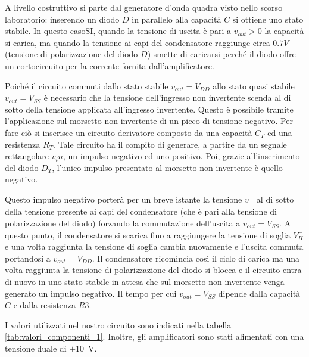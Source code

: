 A livello costruttivo si parte dal generatore d'onda quadra visto nello scorso laboratorio: inserendo un diodo $D$ in parallelo alla capacità $C$ si ottiene uno stato stabile. In questo casoSI, quando la tensione di uscita è pari a $v_{out}>0$ la capacità si carica, ma quando la tensione ai capi del condensatore raggiunge circa $0.7V$ (tensione di polarizzazione del diodo $D$) smette di caricarsi perché il diodo offre un cortocircuito per la corrente fornita dall'amplificatore. 

\noindent
Poiché il circuito commuti dallo stato stabile $v_{out}=V_{DD}$ allo stato quasi stabile $v_{out}=V_{SS}$ è necessario che la tensione dell'ingresso non invertente scenda al di sotto della tensione applicata all'ingresso invertente. Questo è possibile tramite l'applicazione sul morsetto non invertente di un picco di tensione negativo. Per fare ciò si inserisce un circuito derivatore composto da una capacità $C_T$ ed una resistenza $R_T$. Tale circuito ha il compito di generare, a partire da un segnale rettangolare $v_in$, un impulso negativo ed uno positivo. Poi, grazie all'inserimento del diodo $D_T$, l'unico impulso presentato al morsetto non invertente è quello negativo. 

\noindent
Questo impulso negativo porterà per un breve istante la tensione $v_+$ al di sotto della tensione presente ai capi del condensatore (che è pari alla tensione di polarizzazione del diodo) forzando la commutazione dell'uscita a $v_{out}=V_{SS}$. A questo punto, il condensatore si scarica fino a raggiungere la tensione di soglia $V_H^-$ e una volta raggiunta la tensione di soglia cambia nuovamente e l'uscita commuta portandosi a $v_{out}=V_{DD}$. Il condensatore ricomincia così il ciclo di carica ma una volta raggiunta la tensione di polarizzazione del diodo si blocca e il circuito entra di nuovo in uno stato stabile in attesa che sul morsetto non invertente venga generato un impulso negativo. Il tempo per cui $v_{out}=V_{SS}$ dipende dalla capacità $C$ e dalla resistenza $R3$.

I valori utilizzati nel nostro circuito sono indicati nella tabella \ref{tab:valori_componenti_1}. Inoltre, gli amplificatori sono stati alimentati con una tensione duale di $\pm$\SI{10}{\volt}.

